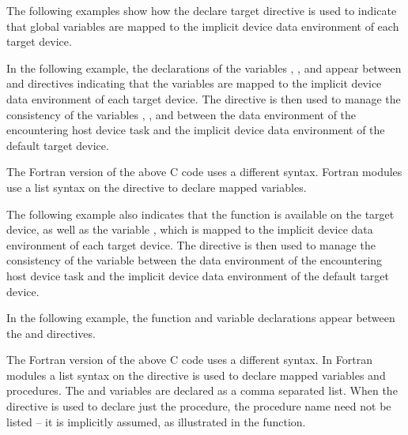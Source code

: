 
The following examples show how the declare target directive is used to indicate that
global variables are mapped to the implicit device data environment of each target device.

In the following example, the declarations of the variables , , and  appear 
between  and  
directives indicating that the variables are mapped to the implicit device data 
environment of each target device. The  directive 
is then used to manage the consistency of the variables , , and  between the 
data environment of the encountering host device task and the implicit device data 
environment of the default target device.


The Fortran version of the above C code uses a different syntax. Fortran modules 
use a list syntax on the  directive to declare 
mapped variables.


\pagebreak
The following example also indicates that the function  is available on the 
target device, as well as the variable , which is mapped to the implicit device 
data environment of each target device. The  directive 
is then used to manage the consistency of the variable  between the data environment 
of the encountering host device task and the implicit device data environment of 
the default target device.

In the following example, the function and variable declarations appear between 
the  and  
directives.


The Fortran version of the above C code uses a different syntax. In Fortran modules 
a list syntax on the  directive is used to declare 
mapped variables and procedures. The  and  variables are declared as a comma 
separated list. When the  directive is used to 
declare just the procedure, the procedure name need not be listed -- it is implicitly 
assumed, as illustrated in the  function.

